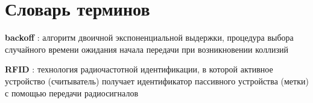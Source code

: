 \chapter*{Словарь терминов}             %



\textbf{backoff} : алгоритм двоичной экспоненциальной выдержки, процедура выбора случайного времени ожидания начала передачи при возникновении коллизий

\textbf{RFID} : технология радиочастотной идентификации, в которой активное устройство (считыватель) получает идентификатор пассивного устройства (метки) с помощью передачи радиосигналов
